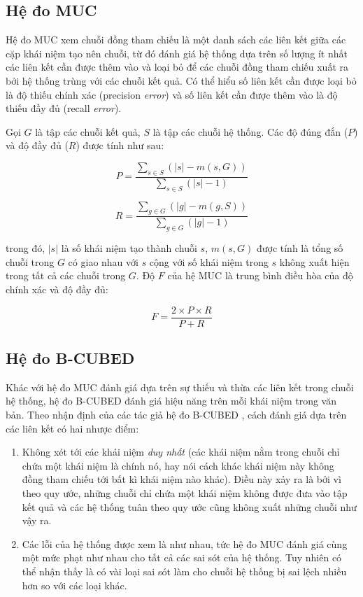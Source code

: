 \subsection*{Hệ đo MUC}
Hệ đo MUC \cite{MarcVilain1995} xem chuỗi đồng tham chiếu là một danh sách các liên kết giữa các cặp khái niệm tạo nên chuỗi, từ đó đánh giá hệ thống dựa trên số lượng ít nhất các liên kết cần được thêm vào và loại bỏ để các chuỗi đồng tham chiếu xuất ra bởi hệ thống trùng với các chuỗi kết quả. Có thể hiểu số liên kết cần được loại bỏ là độ thiếu chính xác (precision \emph{error}) và số liên kết cần được thêm vào là độ thiếu đầy đủ (recall \emph{error}). 

Gọi $G$ là tập các chuỗi kết quả, $S$ là tập các chuỗi hệ thống. Các độ đúng đắn ($P$) và độ đầy đủ ($R$) được tính như sau:

\[P=\frac{\sum_{s\in S} \left(|s| - m(s, G)\right)}{\sum_{s\in S}\left(|s| - 1\right)}\]

\[R=\frac{\sum_{g\in G}(|g|-m(g,S))}{\sum_{g\in G}(|g|-1)}\]

\noindent trong đó, $|s|$ là số khái niệm tạo thành chuỗi $s$, $m(s,G)$ được tính là tổng số chuỗi trong $G$ có giao nhau với $s$ cộng với số khái niệm trong $s$ không xuất hiện trong tất cả các chuỗi trong $G$. Độ $F$ của hệ MUC là trung bình điều hòa của độ chính xác và độ đầy đủ:

\[F=\frac{2\times P\times R}{P + R}\]

\subsection*{Hệ đo B-CUBED}
Khác với hệ đo MUC đánh giá dựa trên sự thiếu và thừa các liên kết trong chuỗi hệ thống, hệ đo B-CUBED đánh giá hiệu năng trên mỗi khái niệm trong văn bản. Theo nhận định của các tác giả hệ đo B-CUBED \cite{AmitBagga1998}, cách đánh giá dựa trên các liên kết có hai nhược điểm:

\begin{enumerate}[leftmargin=\parindent]
\item Không xét tới các khái niệm \emph{duy nhất} (các khái niệm nằm trong chuỗi chỉ chứa một khái niệm là chính nó, hay nói cách khác khái niệm này không đồng tham chiếu tới bất kì khái niệm nào khác). Điều này xảy ra là bởi vì theo quy ước, những chuỗi chỉ chứa một khái niệm không được đưa vào tập kết quả và các hệ thống tuân theo quy ước cũng không xuất những chuỗi như vậy ra.

\item Các lỗi của hệ thống được xem là như nhau, tức hệ đo MUC đánh giá cùng một mức phạt như nhau cho tất cả các sai sót của hệ thống. Tuy nhiên có thể nhận thấy là có vài loại sai sót làm cho chuỗi hệ thống bị sai lệch nhiều hơn so với các loại khác.
\end{enumerate}

